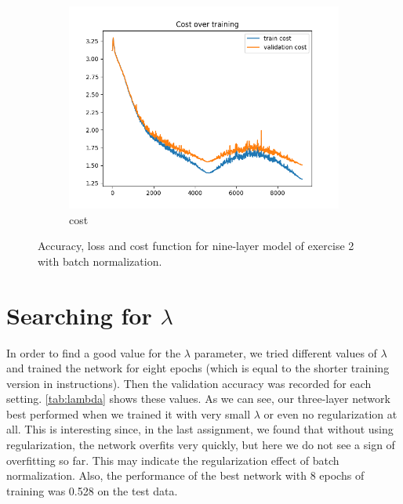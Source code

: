 \documentclass[a4paper]{article}
\begin{document}
\begin{figure}[h]
\begin{subfigure}{0.3\textwidth}
		\includegraphics[width=\linewidth]{images/ex2_with_batch_9layer_cost.png}
		\caption{cost}
	\end{subfigure}
	\caption{Accuracy, loss and cost function for nine-layer model of exercise 2 with batch normalization.}
	\label{fig:9layer_with_bn}
\end{figure}

\section{Searching for $\lambda$}

In order to find a good value for the $\lambda$ parameter, we tried different values of $\lambda$ and trained the network for eight epochs (which is equal to the shorter training version in instructions). Then the validation accuracy was recorded for each setting. \autoref{tab:lambda} shows these values. As we can see, our three-layer network best performed when we trained it with very small $\lambda$ or even no regularization at all. This is interesting since, in the last assignment, we found that without using regularization, the network overfits very quickly, but here we do not see a sign of overfitting so far. This may indicate the regularization effect of batch normalization. Also, the performance of the best network with 8 epochs of training was 0.528 on the test data.
\end{document}
